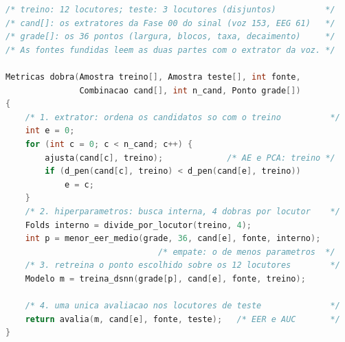 \begin{lstlisting}[language=C, caption={Fase 01 --- uma dobra externa do protocolo por dobra. Toda escolha usa só os locutores de treino da dobra; os de teste são pontuados uma única vez.}, label={lst:e05Phase01}]
/* treino: 12 locutores; teste: 3 locutores (disjuntos)          */
/* cand[]: os extratores da Fase 00 do sinal (voz 153, EEG 61)   */
/* grade[]: os 36 pontos (largura, blocos, taxa, decaimento)     */
/* As fontes fundidas leem as duas partes com o extrator da voz. */

Metricas dobra(Amostra treino[], Amostra teste[], int fonte,
               Combinacao cand[], int n_cand, Ponto grade[])
{
    /* 1. extrator: ordena os candidatos so com o treino          */
    int e = 0;
    for (int c = 0; c < n_cand; c++) {
        ajusta(cand[c], treino);             /* AE e PCA: treino */
        if (d_pen(cand[c], treino) < d_pen(cand[e], treino))
            e = c;
    }
    /* 2. hiperparametros: busca interna, 4 dobras por locutor    */
    Folds interno = divide_por_locutor(treino, 4);
    int p = menor_eer_medio(grade, 36, cand[e], fonte, interno);
                               /* empate: o de menos parametros  */
    /* 3. retreina o ponto escolhido sobre os 12 locutores        */
    Modelo m = treina_dsnn(grade[p], cand[e], fonte, treino);

    /* 4. uma unica avaliacao nos locutores de teste              */
    return avalia(m, cand[e], fonte, teste);   /* EER e AUC       */
}
\end{lstlisting}
